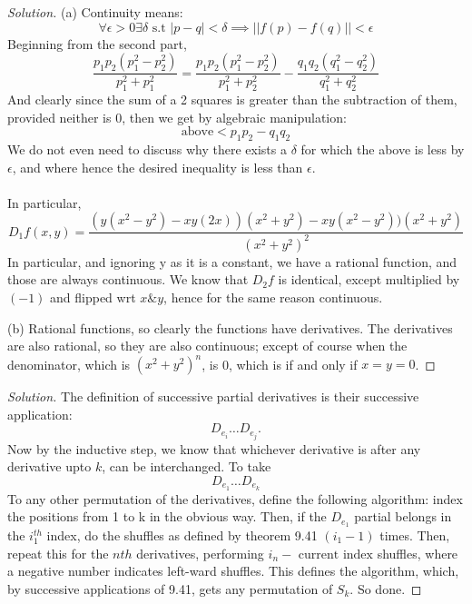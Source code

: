 \documentclass{article}
\newenvironment{problem}[2][Problem]{\begin{trivlist}
\item[\hskip \labelsep {\bfseries #1}\hskip \labelsep {\bfseries #2.}]}{\end{trivlist}}
\newenvironment{solution}{\begin{proof}[Solution]}{\end{proof}}
\begin{document}
\begin{solution}
	(a)	Continuity means: \[
		\forall \epsilon > 0 \exists \delta \text{ s.t } |p-q|<\delta \implies ||f(p)-f(q)||<\epsilon    
	\]
	Beginning from the second part, \[
		\frac{p_{1}p_{2}(p_{1}^{2}-p_{2}^{2})}{p_{1}^{2}+p_{1}^{2}}   = \frac{p_1 p_2(p_{1}^{2}-p_{2}^{2})}{p_{1}^{2}+p_{2}^{2}}- \frac{q_1 q_2(q_{1}^{2}-q_{2}^{2})}{q_{1}^{2}+q_{2}^{2}} 
		
	\]
	And clearly since the sum of a 2 squares is greater than the subtraction of them, provided neither is 0, then we get by algebraic manipulation:
	\[
		\text{above}< p_1 p_2 - q_1 q_2
		\]
		We do not even need to discuss why there exists a $\delta$ for which the above is less by $\epsilon$, and where hence the desired inequality is less than $\epsilon$.
\\ \\
In particular, \[
	D_{1}f(x,y) = \frac{(y(x^{2}-y^{2})-xy(2x))(x^{2}+y^{2})- xy(x^{2}-y^{2}))(x^{2}+y^{2})}{(x^{2}+y^{2})^{2}}   
\]
In particular, and ignoring y as it is a constant, we have a rational function, and those are always continuous. We know that $D_{2}f$ is identical, except multiplied by $(-1)$ and flipped wrt $x \& y$, hence for the same reason continuous.

(b) Rational functions, so clearly the functions have derivatives. The derivatives are also rational, so they are also continuous; except of course when the denominator, which is $(x^{2}+y^{2})^{n}$, is 0, which is if and only if $x=y=0$. 
\end{solution}
\begin{problem}{9.29}
\end{problem}
\begin{solution}
	The definition of successive partial derivatives is their successive application: \[
		D_{e_{i}}\dots D_{e_{j}}.
	\]
	Now by the inductive step, we know that whichever derivative is after any derivative upto $k$, can be interchanged. To take \[
		D_{e_{1}}\dots D_{e_{k}}
	\] To any other permutation of the derivatives, define the following algorithm: index the positions from 1 to k in the obvious way. Then, if the $D_{e_{1}}$ partial belongs in the $i_{1}^{th}$ index, do the shuffles as defined by theorem 9.41 $(i_{1}-1)$ times. Then, repeat this for the $nth$ derivatives, performing $i_{n}- \text{ current index}$ shuffles, where a negative number indicates left-ward shuffles. This defines the algorithm, which, by successive applications of 9.41, gets any permutation of $S_{k}$. So done.

\end{solution}
\end{document}
